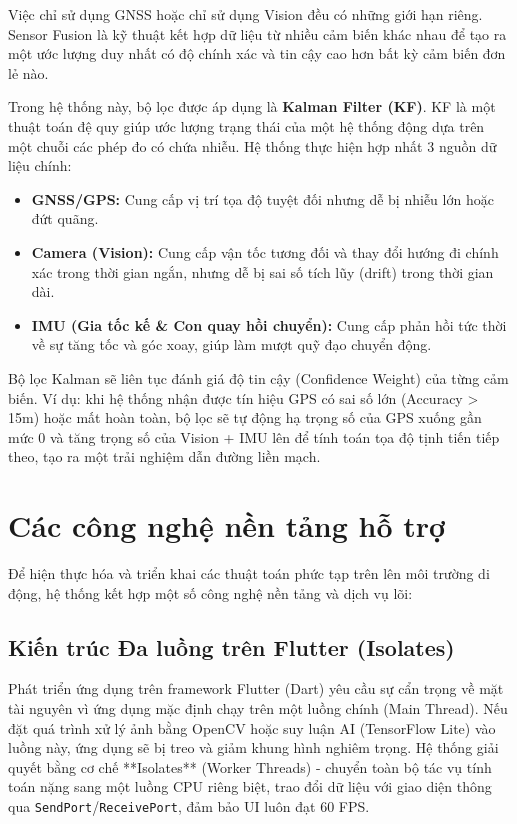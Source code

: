 \documentclass[../DoAn.tex]{subfiles}
\begin{document}
Việc chỉ sử dụng GNSS hoặc chỉ sử dụng Vision đều có những giới hạn riêng. Sensor Fusion là kỹ thuật kết hợp dữ liệu từ nhiều cảm biến khác nhau để tạo ra một ước lượng duy nhất có độ chính xác và tin cậy cao hơn bất kỳ cảm biến đơn lẻ nào.

Trong hệ thống này, bộ lọc được áp dụng là \textbf{Kalman Filter (KF)}. KF là một thuật toán đệ quy giúp ước lượng trạng thái của một hệ thống động dựa trên một chuỗi các phép đo có chứa nhiễu.
Hệ thống thực hiện hợp nhất 3 nguồn dữ liệu chính:
\begin{itemize}
    \item \textbf{GNSS/GPS:} Cung cấp vị trí tọa độ tuyệt đối nhưng dễ bị nhiễu lớn hoặc đứt quãng.
    \item \textbf{Camera (Vision):} Cung cấp vận tốc tương đối và thay đổi hướng đi chính xác trong thời gian ngắn, nhưng dễ bị sai số tích lũy (drift) trong thời gian dài.
    \item \textbf{IMU (Gia tốc kế \& Con quay hồi chuyển):} Cung cấp phản hồi tức thời về sự tăng tốc và góc xoay, giúp làm mượt quỹ đạo chuyển động.
\end{itemize}
Bộ lọc Kalman sẽ liên tục đánh giá độ tin cậy (Confidence Weight) của từng cảm biến. Ví dụ: khi hệ thống nhận được tín hiệu GPS có sai số lớn (Accuracy > 15m) hoặc mất hoàn toàn, bộ lọc sẽ tự động hạ trọng số của GPS xuống gần mức 0 và tăng trọng số của Vision + IMU lên để tính toán tọa độ tịnh tiến tiếp theo, tạo ra một trải nghiệm dẫn đường liền mạch.

\section{Các công nghệ nền tảng hỗ trợ}
\label{section:2.5}

Để hiện thực hóa và triển khai các thuật toán phức tạp trên lên môi trường di động, hệ thống kết hợp một số công nghệ nền tảng và dịch vụ lõi:

\subsection{Kiến trúc Đa luồng trên Flutter (Isolates)}
Phát triển ứng dụng trên framework Flutter (Dart) yêu cầu sự cẩn trọng về mặt tài nguyên vì ứng dụng mặc định chạy trên một luồng chính (Main Thread). Nếu đặt quá trình xử lý ảnh bằng OpenCV hoặc suy luận AI (TensorFlow Lite) vào luồng này, ứng dụng sẽ bị treo và giảm khung hình nghiêm trọng. Hệ thống giải quyết bằng cơ chế **Isolates** (Worker Threads) - chuyển toàn bộ tác vụ tính toán nặng sang một luồng CPU riêng biệt, trao đổi dữ liệu với giao diện thông qua \texttt{SendPort}/\texttt{ReceivePort}, đảm bảo UI luôn đạt 60 FPS.
\end{document}
